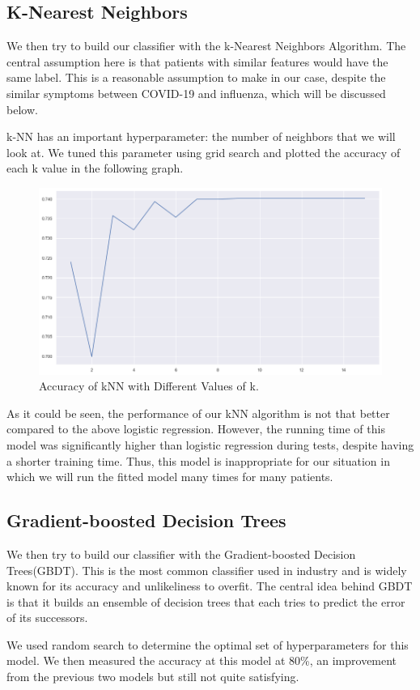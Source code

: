 \documentclass[a4paper, 11pt]{article}
\begin{document}
\subsection*{K-Nearest Neighbors}
We then try to build our classifier with the k-Nearest Neighbors Algorithm. The central assumption here is that patients with similar features would have the same label. This is a reasonable assumption to make in our case, despite the similar symptoms between COVID-19 and influenza, which will be discussed below.\par
k-NN has an important hyperparameter: the number of neighbors that we will look at. We tuned this parameter using grid search and plotted the accuracy of each k value in the following graph.
\begin{figure}[H]
\centering
\includegraphics[scale=0.4]{knn.png}
\caption{Accuracy of kNN with Different Values of k.}
\label{Confirmed Cases}
\end{figure}
As it could be seen, the performance of our kNN algorithm is not that better compared to the above logistic regression. However, the running time of this model was significantly higher than logistic regression during tests, despite having a shorter training time. Thus, this model is inappropriate for our situation in which we will run the fitted model many times for many patients.

\subsection*{Gradient-boosted Decision Trees}
We then try to build our classifier with the Gradient-boosted Decision Trees(GBDT). This is the most common classifier used in industry and is widely known for its accuracy and unlikeliness to overfit. The central idea behind GBDT is that it builds an ensemble of decision trees that each tries to predict the error of its successors. \par
We used random search to determine the optimal set of hyperparameters for this model. We then measured the accuracy at this model at 80\%, an improvement from the previous two models but still not quite satisfying. 
\end{document}
